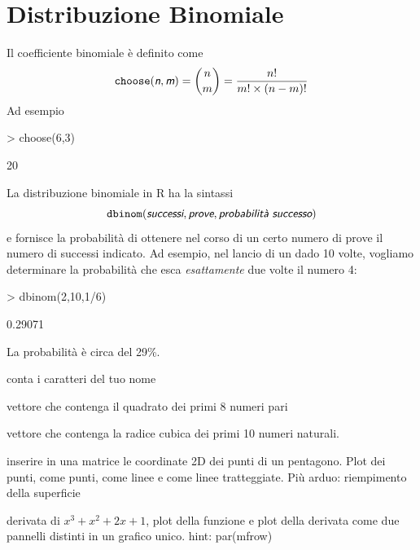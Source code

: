 \documentclass[onecolumn,11pt]{book}
\newcommand{\varia}[1]{\textsl{\textsf{#1}}}
\begin{document}
\section{Distribuzione Binomiale}
Il coefficiente binomiale \`e definito come 
\begin{equation*} \texttt{choose}(\varia{n},\varia{m})={n \choose m}=\dfrac{n!}{m!\times (n-m)!}\end{equation*}
Ad esempio  
\begin{Schunk}
\begin{Sinput}
> choose(6,3)
\end{Sinput}
\begin{Soutput}
[1] 20
\end{Soutput}
\end{Schunk}
La distribuzione binomiale in \textsf{R} ha la sintassi $$\texttt{dbinom}(\varia{successi},\varia{prove},
\varia{probabilit\`a successo})$$ e fornisce la  probabilit\`a di ottenere nel corso di un certo numero di prove  il numero di successi indicato.
Ad esempio, nel lancio di un dado 10 volte, vogliamo determinare la  probabilit\`a che esca  \emph{esattamente} due volte il numero 4:
\begin{Schunk}
\begin{Sinput}
> dbinom(2,10,1/6)
\end{Sinput}
\begin{Soutput}
[1] 0.29071
\end{Soutput}
\end{Schunk}

La  probabilit\`a \`e circa del 29\%.

 
\begin{shaded}
\begin{description}
 \item{}conta i caratteri del tuo nome
\item{} vettore che contenga il quadrato dei primi 8 numeri pari
\item{}vettore che contenga la radice cubica dei primi 10 numeri naturali.
\item{}inserire in una matrice le coordinate 2D dei punti di un pentagono. Plot dei punti, come punti, come linee e come linee tratteggiate. Pi\`u arduo: riempimento della superficie
\item{}derivata di $x^3+x^2+2x+1$, plot della funzione e plot della derivata come due pannelli distinti in un grafico unico. hint: par(mfrow)
\end{description}
\end{shaded}  
 
\end{document}
